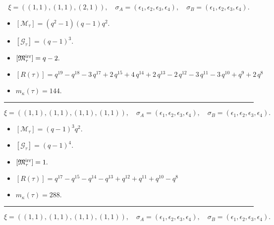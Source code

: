 \documentclass[10pt,a4paper]{amsart}
\begin{document}
$$\xi = ({(1, 1)}, {(1, 1)}, {(2, 1)}),\quad \sigma_A = ({{\epsilon_1}}, {{\epsilon_2}}, {{\epsilon_3, \epsilon_4}}),\quad \sigma_B = ({{\epsilon_1}}, {{\epsilon_2}}, {{\epsilon_3, \epsilon_4}}).$$

\begin{itemize}
 \item $[\mathcal{M}_{\tau}] = {\left(q^{2} - 1\right)} {\left(q - 1\right)} q^{2} .$

 \item $[\mathcal{G}_{\tau}] = {\left(q - 1\right)}^{3} .$

 \item $[{\frak M}_{\tau}^{\textrm{irr}}] = q - 2 .$

 \item $[R(\tau)] = q^{19} - q^{18} - 3 \, q^{17} + 2 \, q^{15} + 4 \, q^{14} + 2 \, q^{13} - 2 \, q^{12} - 3 \, q^{11} - 3 \, q^{10} + q^{9} + 2 \, q^{8} $

 \item $m_{\kappa}(\tau) = 144 .$

 \end{itemize}
\noindent\rule{8cm}{0.4pt}

$$\xi = ({(1, 1)}, {(1, 1)}, {(1, 1), (1, 1)}),\quad \sigma_A = ({{\epsilon_1}}, {{\epsilon_2}}, {{\epsilon_3}, {\epsilon_4}}),\quad \sigma_B = ({{\epsilon_1}}, {{\epsilon_2}}, {{\epsilon_3}, {\epsilon_4}}).$$

\begin{itemize}
 \item $[\mathcal{M}_{\tau}] = {\left(q - 1\right)}^{3} q^{2} .$

 \item $[\mathcal{G}_{\tau}] = {\left(q - 1\right)}^{4} .$

 \item $[{\frak M}_{\tau}^{\textrm{irr}}] = 1 .$

 \item $[R(\tau)] = q^{17} - q^{15} - q^{14} - q^{13} + q^{12} + q^{11} + q^{10} - q^{8} $

 \item $m_{\kappa}(\tau) = 288 .$

 \end{itemize}
\noindent\rule{8cm}{0.4pt}

$$\xi = ({(1, 1)}, {(1, 1)}, {(1, 1)}, {(1, 1)}),\quad \sigma_A = ({{\epsilon_1}}, {{\epsilon_2}}, {{\epsilon_3}}, {{\epsilon_4}}),\quad \sigma_B = ({{\epsilon_1}}, {{\epsilon_2}}, {{\epsilon_3}}, {{\epsilon_4}}).$$
\end{document}
